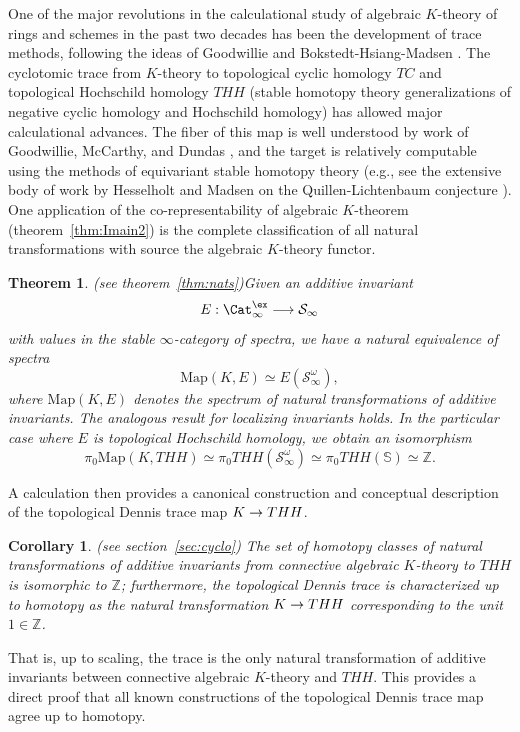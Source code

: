\documentclass{amsart}
\renewcommand{\to}{\mathchoice{\longrightarrow}{\rightarrow}{\rightarrow}{\rightarrow}}
\let\catsymbfont\mathcal
\newcommand{\aS}{{\catsymbfont{S}}}
\newcommand{\bZ}{{\mathbb{Z}}}
\newcommand{\stabcat}{\Cat_\i^{\ex}}
\newcommand{\Map}{\mathrm{Map}}%
\newcommand{\bbS}{\mathbb{S}}
\newcommand{\ispec}{\aS_{\infty}}
\newcommand{\too}{\longrightarrow}%
\renewcommand{\i}{\infty}
\numberwithin{equation}{section}
\newtheorem{theorem}[equation]{Theorem}
\newtheorem{corollary}[equation]{Corollary}
\theoremstyle{definition}
\begin{document}
One of the major revolutions in the calculational study of algebraic
$K$-theory of rings and schemes in the past two decades has been the
development of trace methods, following the ideas of Goodwillie and
Bokstedt-Hsiang-Madsen \cite{BokstedtHsiangMadsen}.  The cyclotomic
trace from $K$-theory to topological cyclic homology $TC$ and
topological Hochschild homology $THH$ (stable homotopy theory
generalizations of negative cyclic homology and Hochschild homology)
has allowed major calculational advances.  The fiber of this map is
well understood by work of Goodwillie, McCarthy, and
Dundas \cite{McCarthyFib, DundasFib}, and the target is relatively
computable using the methods of equivariant stable homotopy theory
(e.g., see the extensive body of work by Hesselholt and Madsen on the
Quillen-Lichtenbaum conjecture \cite{HesselholtMadsen}).  One
application of the co-representability of algebraic $K$-theorem
(theorem~\ref{thm:Imain2}) is the complete
classification of all natural transformations with source the
algebraic $K$-theory functor.

\begin{theorem}(see theorem~\ref{thm:nats})\label{thm:inats}
Given an additive invariant
\[
E: \stabcat \too \ispec
\]
with values in the stable $\i$-category of spectra, we have a natural
equivalence of spectra
\[
\Map(K,E) \simeq E(\ispec^{\omega}),
\]
where $\Map(K,E)$ denotes the spectrum of natural transformations of additive invariants.  The
analogous result for localizing invariants holds.  In the particular
case where $E$ is topological Hochschild homology, we obtain an
isomorphism 
\[
\pi_0\Map(K, THH) \simeq \pi_0 THH(\ispec^{\omega}) \simeq \pi_0
THH(\bbS) \simeq \bZ.
\]
\end{theorem}

A calculation then provides a canonical construction and conceptual
description of the topological Dennis trace map $K \to THH$.

\begin{corollary}{(see section~\ref{sec:cyclo})}
The set of homotopy classes of natural transformations of additive
invariants from connective algebraic $K$-theory to $THH$ is isomorphic
to $\bZ$; furthermore, the topological Dennis trace is
characterized up to homotopy as the natural transformation $K \to THH$
corresponding to the unit $1 \in \bZ$.
\end{corollary}

That is, up to scaling, the trace is the only natural
transformation of additive invariants between connective algebraic
$K$-theory and $THH$.  This provides a direct proof that all known
constructions of the topological Dennis trace map agree up to
homotopy.
\end{document}
